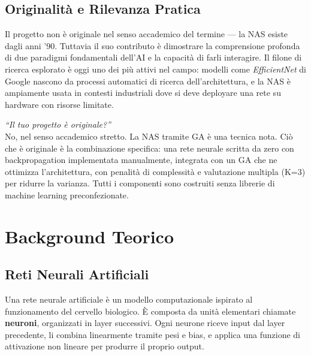 \documentclass[12pt, a4paper]{article}
\begin{document}
\subsection{Originalità e Rilevanza Pratica}

Il progetto non è originale nel senso accademico del termine --- la NAS esiste
dagli anni '90. Tuttavia il suo contributo è dimostrare la comprensione
profonda di due paradigmi fondamentali dell'AI e la capacità di farli
interagire. Il filone di ricerca esplorato è oggi uno dei più attivi nel campo:
modelli come \textit{EfficientNet} di Google nascono da processi automatici di
ricerca dell'architettura, e la NAS è ampiamente usata in contesti industriali
dove si deve deployare una rete su hardware con risorse limitate.

\begin{domanda}
\textit{``Il tuo progetto è originale?''}\\
No, nel senso accademico stretto. La NAS tramite GA è una tecnica nota. Ciò
che è originale è la combinazione specifica: una rete neurale scritta da zero
con backpropagation implementata manualmente, integrata con un GA che ne
ottimizza l'architettura, con penalità di complessità e valutazione multipla
(K=3) per ridurre la varianza. Tutti i componenti sono costruiti senza
librerie di machine learning preconfezionate.
\end{domanda}

\newpage

\section{Background Teorico}

\subsection{Reti Neurali Artificiali}

Una rete neurale artificiale è un modello computazionale ispirato al
funzionamento del cervello biologico. È composta da unità elementari
chiamate \textbf{neuroni}, organizzati in layer successivi. Ogni neurone riceve
input dal layer precedente, li combina linearmente tramite pesi e bias,
e applica una funzione di attivazione non lineare per produrre il proprio output.
\end{document}
